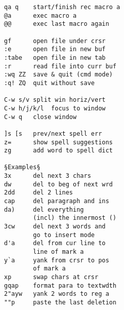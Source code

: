\documentclass{article}
\begin{document}
\begin{multicols}{4}
\begin{lstlisting}
qa q    start/finish rec macro a
@a      exec macro a
@@      exec last macro again

gf      open file under crsr
:e      open file in new buf
:tabe   open file in new tab
:r      read file into curr buf
:wq ZZ  save & quit (cmd mode)
:q! ZQ  quit without save

C-w s/v split win horiz/vert
C-w h/j/k/l  focus to window
C-w q   close window

]s [s   prev/next spell err
z=      show spell suggestions
zg      add word to spell dict

§Examples§
3x      del next 3 chars
dw      del to beg of next wrd
2dd     del 2 lines
cap     del paragraph and ins
da)     del everything
        (incl) the innermost ()
3cw     del next 3 words and
        go to insert mode
d'a     del from cur line to
        line of mark a
y`a     yank from crsr to pos
        of mark a
xp      swap chars at crsr
gqap    format para to textwdth
2"ayw   yank 2 words to reg a
""p     paste the last deletion
\end{lstlisting}
\end{multicols}
\end{document}
